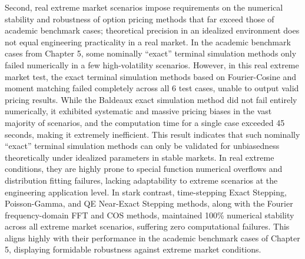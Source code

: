 Second, real extreme market scenarios impose requirements on the numerical stability and robustness of option pricing methods that far exceed those of academic benchmark cases; theoretical precision in an idealized environment does not equal engineering practicality in a real market. In the academic benchmark cases from Chapter 5, some nominally ``exact'' terminal simulation methods only failed numerically in a few high-volatility scenarios. However, in this real extreme market test, the exact terminal simulation methods based on Fourier-Cosine and moment matching failed completely across all 6 test cases, unable to output valid pricing results. While the Baldeaux exact simulation method did not fail entirely numerically, it exhibited systematic and massive pricing biases in the vast majority of scenarios, and the computation time for a single case exceeded 45 seconds, making it extremely inefficient. This result indicates that such nominally ``exact'' terminal simulation methods can only be validated for unbiasedness theoretically under idealized parameters in stable markets. In real extreme conditions, they are highly prone to special function numerical overflows and distribution fitting failures, lacking adaptability to extreme scenarios at the engineering application level. In stark contrast, time-stepping Exact Stepping, Poisson-Gamma, and QE Near-Exact Stepping methods, along with the Fourier frequency-domain FFT and COS methods, maintained 100\% numerical stability across all extreme market scenarios, suffering zero computational failures. This aligns highly with their performance in the academic benchmark cases of Chapter 5, displaying formidable robustness against extreme market conditions.

